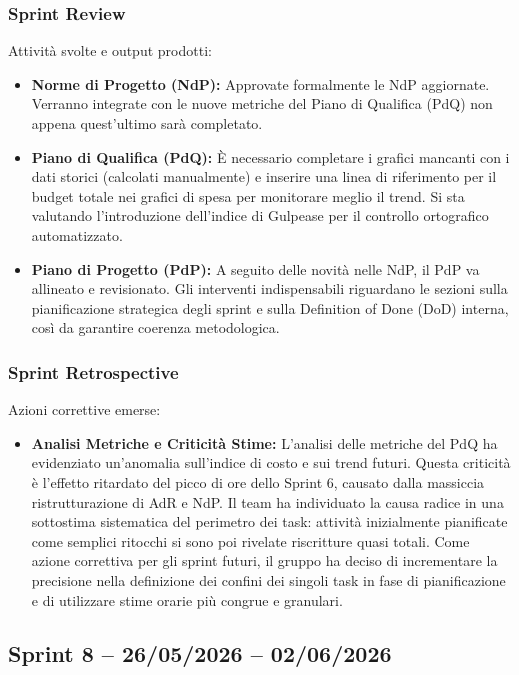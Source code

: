 \subsubsection{Sprint Review}
Attività svolte e output prodotti:
\begin{itemize}
    \item \textbf{Norme di Progetto (NdP):} Approvate formalmente le NdP aggiornate. 
    Verranno integrate con le nuove metriche del Piano di Qualifica (PdQ) non appena quest'ultimo sarà completato.
    \item \textbf{Piano di Qualifica (PdQ):} È necessario completare i grafici mancanti con i dati storici 
    (calcolati manualmente) e inserire una linea di riferimento per il budget totale nei grafici 
    di spesa per monitorare meglio il trend. 
    Si sta valutando l'introduzione dell'indice di Gulpease per il controllo ortografico automatizzato.
    \item \textbf{Piano di Progetto (PdP):} A seguito delle novità nelle NdP, 
    il PdP va allineato e revisionato. Gli interventi indispensabili riguardano 
    le sezioni sulla pianificazione strategica degli sprint e sulla Definition of Done (DoD) interna,
    così da garantire coerenza metodologica.
\end{itemize}

\subsubsection{Sprint Retrospective}
Azioni correttive emerse:
\begin{itemize}
    \item \textbf{Analisi Metriche e Criticità Stime:} L'analisi delle metriche del PdQ ha evidenziato 
    un'anomalia sull'indice di costo e sui trend futuri. Questa criticità è l'effetto ritardato del picco di ore 
    dello Sprint 6, causato dalla massiccia ristrutturazione di AdR e NdP.
    Il team ha individuato la causa radice in una sottostima sistematica del perimetro dei task:
    attività inizialmente pianificate come semplici ritocchi si sono poi rivelate riscritture quasi totali.
    Come azione correttiva per gli sprint futuri, il gruppo ha deciso di incrementare la precisione nella definizione 
    dei confini dei singoli task in fase di pianificazione e di utilizzare stime orarie più congrue e granulari.
\end{itemize}

\subsection{Sprint 8 -- 26/05/2026 -- 02/06/2026}
\label{sec:sprint8}


